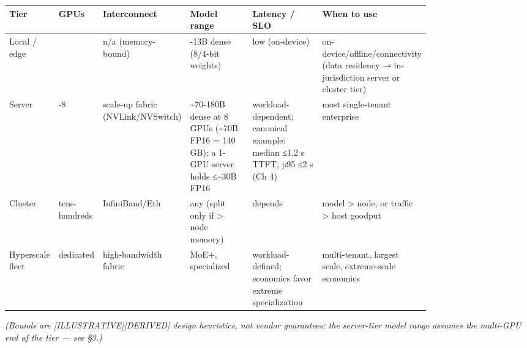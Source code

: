 \nopagebreak[4]
\begin{longtable}[]{@{}
  >{\raggedright\arraybackslash}p{0.0291\linewidth}
  >{\raggedright\arraybackslash}p{0.0291\linewidth}
  >{\raggedright\arraybackslash}p{0.1747\linewidth}
  >{\raggedright\arraybackslash}p{0.2330\linewidth}
  >{\raggedright\arraybackslash}p{0.2330\linewidth}
  >{\raggedright\arraybackslash}p{0.0971\linewidth}@{}}
\toprule\noalign{}
\begin{minipage}[b]{\linewidth}\raggedright
Tier
\end{minipage} & \begin{minipage}[b]{\linewidth}\raggedright
GPUs
\end{minipage} & \begin{minipage}[b]{\linewidth}\raggedright
Interconnect
\end{minipage} & \begin{minipage}[b]{\linewidth}\raggedright
Model range
\end{minipage} & \begin{minipage}[b]{\linewidth}\raggedright
Latency / SLO
\end{minipage} & \begin{minipage}[b]{\linewidth}\raggedright
When to use
\end{minipage} \\
\midrule\noalign{}
\endhead
\bottomrule\noalign{}
\endlastfoot
Local / edge & 1 & n/a (memory-bound) & 7-13B dense (8/4-bit weights) &
low (on-device) & on-device/offline/connectivity (data residency →
in-jurisdiction server or cluster tier) \\
\noalign{\label{tab:13.1}}
Server & 1-8 & scale-up fabric (NVLink/NVSwitch) &
\textasciitilde70-180B dense at 8 GPUs (\textasciitilde70B FP16 = 140
GB); a 1-GPU server holds ≤\textasciitilde30B FP16 & workload-dependent;
canonical example: median ≤1.2 s TTFT, p95 ≤2 s (Ch 4) & most
single-tenant enterprise \\
Cluster & tens-hundreds & InfiniBand/Eth & any (split only if
\textgreater{} node memory) & depends & model \textgreater{} node, or
traffic \textgreater{} host goodput \\
Hyperscale fleet & dedicated & high-bandwidth fabric & MoE+, specialized
& workload-defined; economics favor extreme specialization &
multi-tenant, largest scale, extreme-scale economics \\
\end{longtable}

\emph{(Bounds are \mbox{{[}ILLUSTRATIVE{]}}\hspace{0pt}\mbox{{[}DERIVED{]}} design heuristics, not
vendor guarantees; the server-tier model range assumes the multi-GPU end
of the tier --- see §3.)}

